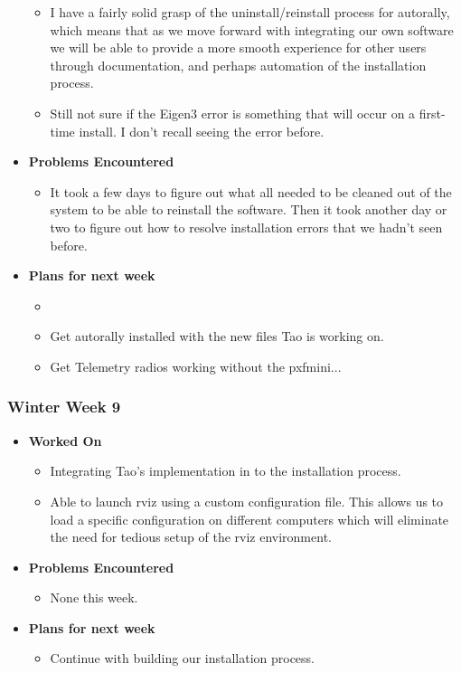 \documentclass[compsoc,draftclsnofoot,onecolumn,10pt]{IEEEtran}
\begin{document}
\begin{itemize}
\begin{itemize}
    \item I have a fairly solid grasp of the uninstall/reinstall process for autorally, which means that as we move forward with integrating our own software we will be able to provide a more smooth experience for other users through documentation, and perhaps automation of the installation process.

    \item Still not sure if the Eigen3 error is something that will occur on a first-time install. I don't recall seeing the error before.

    \end{itemize}

    \item {\textbf{Problems Encountered}}
    \begin{itemize}
        \item It took a few days to figure out what all needed to be cleaned out of the system to be able to reinstall the software. Then it took another day or two to figure out how to resolve installation errors that we hadn't seen before.
    \end{itemize}

    \item{\textbf{Plans for next week}}
    \begin{itemize}
        \item         \item Get autorally installed with the new files Tao is working on.
        \item Get Telemetry radios working without the pxfmini...
    \end{itemize}
\end{itemize}

\subsubsection{Winter Week 9}
\begin{itemize}
    \item {\textbf{Worked On}}
    \begin{itemize}
        \item Integrating Tao's implementation in to the installation process.
        \item Able to launch rviz using a custom configuration file. This allows us to load a specific configuration on different computers which will eliminate the need for tedious setup of the rviz environment.
    \end{itemize}

    \item {\textbf{Problems Encountered}}
    \begin{itemize}
        \item None this week.
    \end{itemize}

    \item{\textbf{Plans for next week}}
    \begin{itemize}
        \item Continue with building our installation process.
    \end{itemize}
\end{itemize}
\end{document}

